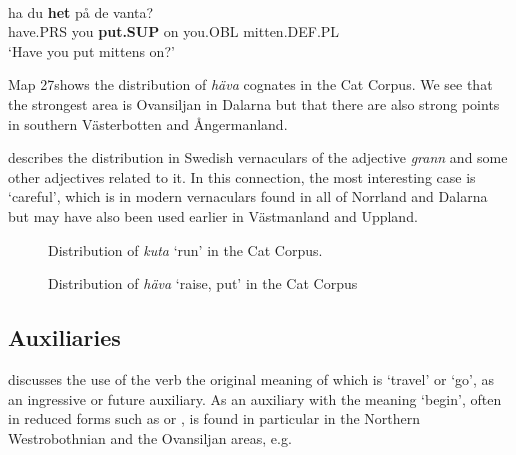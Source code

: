 \ea\label{}
\\
\gll ha  du  \textbf{het} på  de  vanta?\\
have.PRS  you  \textbf{put.SUP} on  you.OBL  mitten.DEF.PL\\
\glt ‘Have you put mittens on?’
\z

Map 27shows the distribution of \textit{häva} cognates in the Cat Corpus. We see that the strongest area is Ovansiljan in Dalarna but that there are also strong points in southern Västerbotten and Ångermanland. 



\citet{Eaker1993} describes the distribution in Swedish vernaculars of the adjective \textit{grann} and some other adjectives related to it. In this connection, the most interesting case is  ‘careful’, which is in modern vernaculars found in all of Norrland and Dalarna but may have also been used earlier in Västmanland and Uppland. 





 



\begin{figure}[h] 
\caption{Distribution of \textit{kuta}\textit{ }‘run’ in the Cat Corpus.}
\label{map:6:27}
\end{figure}


 

\begin{figure}[h] 
\caption{Distribution of \textit{häva} ‘raise, put’ in the Cat Corpus}
\label{map:6:28}
\end{figure}


\subsection{Auxiliaries}

\citet{Holm1941} discusses the use of the verb the original meaning of which is ‘travel’ or ‘go’, as an ingressive or future auxiliary. As an auxiliary with the meaning ‘begin’, often in reduced forms such as  or , is found in particular in the Northern Westrobothnian and the Ovansiljan areas, e.g. 

